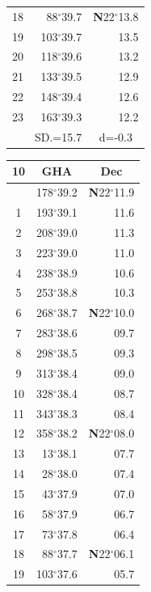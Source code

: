\documentclass[10pt, a4paper]{report}
\begin{document}
\begin{scriptsize}
\begin{tabular*}{0.2\textwidth}[t]{@{\extracolsep{\fill}}|c|rr|}
18 & 88$^\circ$39.7 & \textbf{N}22$^\circ$13.8\\
19 & 103$^\circ$39.7 & 13.5\\
20 & 118$^\circ$39.6 & 13.2\\
21 & 133$^\circ$39.5 & \raisebox{0.24ex}{\boldmath$\cdot$~\boldmath$\cdot$~~}12.9\\
22 & 148$^\circ$39.4 & 12.6\\
23 & 163$^\circ$39.3 & 12.2\\
\hline
\rule{0pt}{2.4ex} & \multicolumn{1}{c}{SD.=15.7} & \multicolumn{1}{c|}{d=-0.3}\\
\hline
\end{tabular*}\noindent
\begin{tabular*}{0.2\textwidth}[t]{@{\extracolsep{\fill}}|c|rr|}
\hline
\multicolumn{1}{|c|}{\rule{0pt}{2.6ex}\textbf{10}} & \multicolumn{1}{c}{\textbf{GHA}} & \multicolumn{1}{c|}{\textbf{Dec}}\\
\hline\rule{0pt}{2.6ex}\noindent
0 & 178$^\circ$39.2 & \textbf{N}22$^\circ$11.9\\
1 & 193$^\circ$39.1 & 11.6\\
2 & 208$^\circ$39.0 & 11.3\\
3 & 223$^\circ$39.0 & \raisebox{0.24ex}{\boldmath$\cdot$~\boldmath$\cdot$~~}11.0\\
4 & 238$^\circ$38.9 & 10.6\\
5 & 253$^\circ$38.8 & 10.3\\[2Pt]
6 & 268$^\circ$38.7 & \textbf{N}22$^\circ$10.0\\
7 & 283$^\circ$38.6 & 09.7\\
8 & 298$^\circ$38.5 & 09.3\\
9 & 313$^\circ$38.4 & \raisebox{0.24ex}{\boldmath$\cdot$~\boldmath$\cdot$~~}09.0\\
10 & 328$^\circ$38.4 & 08.7\\
11 & 343$^\circ$38.3 & 08.4\\[2Pt]
12 & 358$^\circ$38.2 & \textbf{N}22$^\circ$08.0\\
13 & 13$^\circ$38.1 & 07.7\\
14 & 28$^\circ$38.0 & 07.4\\
15 & 43$^\circ$37.9 & \raisebox{0.24ex}{\boldmath$\cdot$~\boldmath$\cdot$~~}07.0\\
16 & 58$^\circ$37.9 & 06.7\\
17 & 73$^\circ$37.8 & 06.4\\[2Pt]
18 & 88$^\circ$37.7 & \textbf{N}22$^\circ$06.1\\
19 & 103$^\circ$37.6 & 05.7\\

\end{tabular*}
\end{scriptsize}
\end{document}
